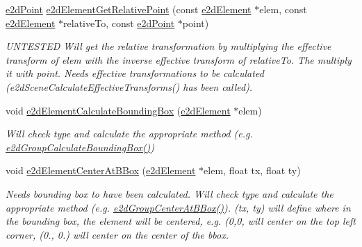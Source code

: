 \begin{DoxyCompactItemize}
\hyperlink{structe2dPoint}{e2d\-Point} \hyperlink{group__e2dElement_gac3ad9f8cdc0782378c9f2e93cb7da68f}{e2d\-Element\-Get\-Relative\-Point} (const \hyperlink{structe2dElement}{e2d\-Element} $\ast$elem, const \hyperlink{structe2dElement}{e2d\-Element} $\ast$relative\-To, const \hyperlink{structe2dPoint}{e2d\-Point} $\ast$point)
\begin{DoxyCompactList}\small\item\em U\-N\-T\-E\-S\-T\-E\-D Will get the relative transformation by multiplying the effective transform of elem with the inverse effective transform of relative\-To. The multiply it with point. Needs effective transformations to be calculated (e2d\-Scene\-Calculate\-Effective\-Transforms() has been called). \end{DoxyCompactList}\item 
void \hyperlink{group__e2dElement_ga94aa710b2da71af2091fe4d5b87ce47e}{e2d\-Element\-Calculate\-Bounding\-Box} (\hyperlink{structe2dElement}{e2d\-Element} $\ast$elem)
\begin{DoxyCompactList}\small\item\em Will check type and calculate the appropriate method (e.\-g. \hyperlink{group__e2dGroup_ga7c5f43489bbd2d36a51414aee07abf5a}{e2d\-Group\-Calculate\-Bounding\-Box()}) \end{DoxyCompactList}\item 
void \hyperlink{group__e2dElement_ga36b01a888c97163c990e16d348aff61c}{e2d\-Element\-Center\-At\-B\-Box} (\hyperlink{structe2dElement}{e2d\-Element} $\ast$elem, float tx, float ty)
\begin{DoxyCompactList}\small\item\em Needs bounding box to have been calculated. Will check type and calculate the appropriate method (e.\-g. \hyperlink{group__e2dGroup_ga04bf94419865ca7f9d6daf30ce3fadf0}{e2d\-Group\-Center\-At\-B\-Box()}). (tx, ty) will define where in the bounding box, the element will be centered, e.\-g. (0,0, will center on the top left corner, (0., 0.) will center on the center of the bbox. \end{DoxyCompactList}\end{DoxyCompactItemize}


